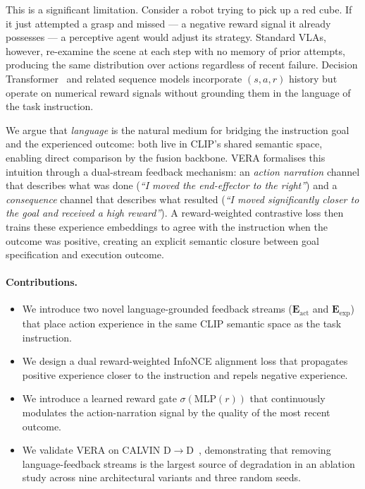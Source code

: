 \documentclass{article}
\newcommand{\vera}{\textsc{VERA}}
\newcommand{\eact}{$\mathbf{E}_\text{act}$}
\newcommand{\eexp}{$\mathbf{E}_\text{exp}$}
\begin{document}
This is a significant limitation. Consider a robot trying to pick up a red cube.
If it just attempted a grasp and missed — a negative reward signal it already
possesses — a perceptive agent would adjust its strategy.
Standard VLAs, however, re-examine the scene at each step with no memory of
prior attempts, producing the same distribution over actions regardless of recent failure.
Decision Transformer~\citep{dt} and related sequence models incorporate
$(s, a, r)$ history but operate on numerical reward signals without grounding
them in the language of the task instruction.

We argue that \emph{language} is the natural medium for bridging the instruction
goal and the experienced outcome: both live in CLIP's shared semantic space, enabling
direct comparison by the fusion backbone.
\vera{} formalises this intuition through a dual-stream feedback mechanism:
an \emph{action narration} channel that describes what was done
(\textit{``I moved the end-effector to the right''}) and a \emph{consequence}
channel that describes what resulted (\textit{``I moved significantly closer to the
goal and received a high reward''}).
A reward-weighted contrastive loss then trains these experience embeddings to
agree with the instruction when the outcome was positive, creating an explicit
semantic closure between goal specification and execution outcome.

\paragraph{Contributions.}
\begin{itemize}[nosep]
  \item We introduce two novel language-grounded feedback streams (\eact{} and \eexp{})
        that place action experience in the same CLIP semantic space as the task instruction.
  \item We design a dual reward-weighted InfoNCE alignment loss that propagates
        positive experience closer to the instruction and repels negative experience.
  \item We introduce a learned reward gate $\sigma(\text{MLP}(r))$ that continuously
        modulates the action-narration signal by the quality of the most recent outcome.
  \item We validate \vera{} on CALVIN D$\rightarrow$D~\citep{calvin}, demonstrating
        that removing language-feedback streams is the largest source of degradation in
        an ablation study across nine architectural variants and three random seeds.
\end{itemize}
\end{document}
